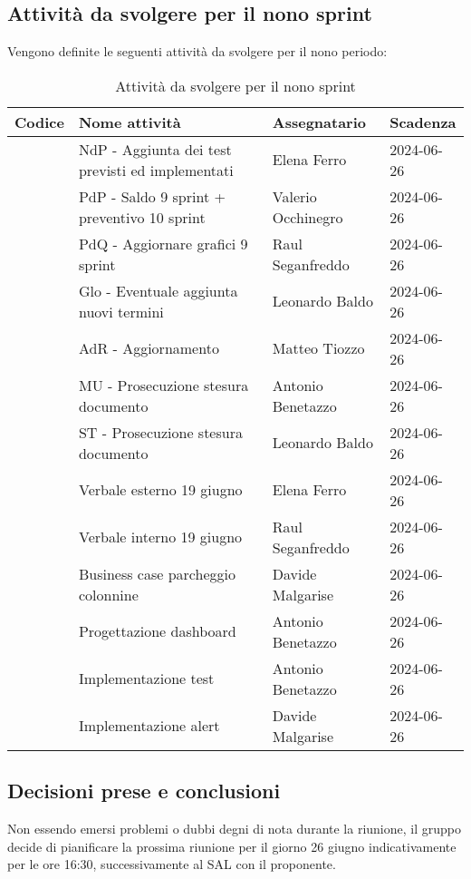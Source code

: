 \documentclass[italian,12pt]{article}
\begin{document}
\subsection{Attività da svolgere per il nono sprint}
Vengono definite le seguenti attività da svolgere per il nono periodo:
\begin{table}[!h]
	\centering
	\begin{tabular}{ |l||p{7cm}|l|l| }
		\hline
		\textbf{Codice}          & \textbf{Nome attività}                           & \textbf{Assegnatario} & \textbf{Scadenza} \\
		\hline
		\mySkip[86bz8e28m]       & NdP - Aggiunta dei test previsti ed implementati & Elena Ferro           & 2024-06-26        \\
		\mySkip[86bz8e6cp]       & PdP - Saldo 9 sprint + preventivo 10 sprint      & Valerio Occhinegro    & 2024-06-26        \\
		\mySkip[86bz8e4ac]       & PdQ - Aggiornare grafici 9 sprint                & Raul Seganfreddo      & 2024-06-26        \\
		\mySkip[86bz8e8g5]       & Glo - Eventuale aggiunta nuovi termini           & Leonardo Baldo        & 2024-06-26        \\
		\mySkip[86bz8e13d]       & AdR - Aggiornamento                              & Matteo Tiozzo         & 2024-06-26        \\
		\mySkip[86bz8e2ja]       & MU - Prosecuzione stesura documento              & Antonio Benetazzo     & 2024-06-26        \\
		\mySkip[86bz8e3xn]       & ST - Prosecuzione stesura documento              & Leonardo Baldo        & 2024-06-26        \\
		\mySkip[86bz9gj8r]       & Verbale esterno 19 giugno                        & Elena Ferro           & 2024-06-26        \\
		\mySkip[86bz9gjd9]       & Verbale interno 19 giugno                        & Raul Seganfreddo      & 2024-06-26        \\
		\mySkip[86bz8dzy0]       & Business case parcheggio colonnine               & Davide Malgarise      & 2024-06-26        \\
		\mySkip[86bz8dzz7]       & Progettazione dashboard                          & Antonio Benetazzo     & 2024-06-26        \\
		\mySkip[86bz8dzzg]       & Implementazione test                             & Antonio Benetazzo     & 2024-06-26        \\
		\mySkip[86bz8e010]       & Implementazione alert                            & Davide Malgarise      & 2024-06-26        \\
		\hline
	\end{tabular}
	\caption{Attività da svolgere per il nono sprint}
\end{table}

\subsection{Decisioni prese e conclusioni}
Non essendo emersi problemi o dubbi degni di nota durante la riunione, il gruppo decide di pianificare la prossima riunione per il giorno 26 giugno indicativamente per le ore 16:30, successivamente al SAL con il proponente.
\end{document}
